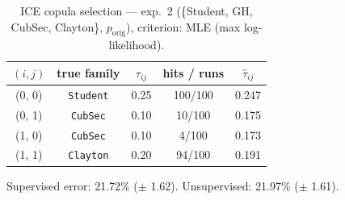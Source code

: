 \begin{table}[htbp]
  \centering
  \caption{ICE copula selection — exp.\ 2 (\{Student, GH, CubSec, Clayton\}, $p_{\text{orig}}$), criterion: MLE (max log-likelihood).}
  \label{tab:exp3-exp2_orig_p__mle}
  \begin{tabular}{ccccc}
    \toprule
    $(i, j)$ & true family & $\tau_{ij}$ & hits / runs & $\hat\tau_{ij}$ \\
    \midrule
    (0, 0) & \texttt{Student} & 0.25 & 100/100 & 0.247 \\
    (0, 1) & \texttt{CubSec} & 0.10 & 10/100 & 0.175 \\
    (1, 0) & \texttt{CubSec} & 0.10 & 4/100 & 0.173 \\
    (1, 1) & \texttt{Clayton} & 0.20 & 94/100 & 0.191 \\
    \bottomrule
  \end{tabular}
  \par\smallskip Supervised error: 21.72\% ($\pm$ 1.62). Unsupervised: 21.97\% ($\pm$ 1.61).
\end{table}
